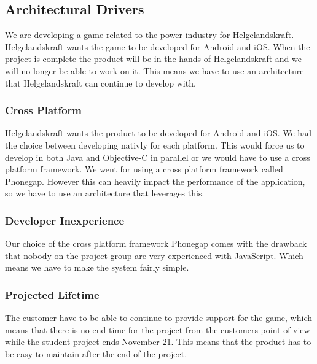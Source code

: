 \subsection{Architectural Drivers}
We are developing a game related to the power industry for Helgelandskraft. Helgelandskraft wants the game to be developed for Android and iOS. When the project is complete the product will be in the hands of Helgelandskraft and we will no longer be able to work on it. This means we have to use an architecture that Helgelandskraft can continue to develop with.

\subsubsection{Cross Platform}
Helgelandskraft wants the product to be developed for Android and iOS. We had the choice between developing nativly for each platform. This would force us to develop in both Java and Objective-C in parallel or we would have to use a cross platform framework. We went for using a cross platform framework called Phonegap. However this can heavily impact the performance of the application, so we have to use an architecture that leverages this.

\subsubsection{Developer Inexperience}
Our choice of the cross platform framework Phonegap comes with the drawback that nobody on the project group are very experienced with JavaScript. Which means we have to make the system fairly simple.

\subsubsection{Projected Lifetime}
The customer have to be able to continue to provide support for the game, which means that there is no end-time for the project from the customers point of view while the student project ends November 21. This means that the product has to be easy to maintain after the end of the project.
